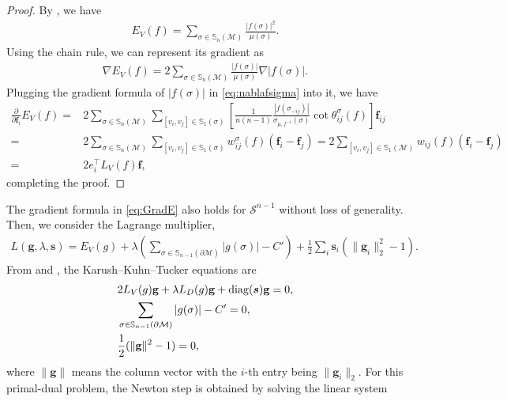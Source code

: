 \documentclass{article}
\begin{document}
\begin{proof}
By , we have
\begin{align}
    E_V(f) =  \sum_{\sigma\in\mathbb{S}_n(\mathcal{M})} \frac{|f(\sigma)|^2}{\mu(\sigma)}.
\end{align}
Using the chain rule, we can represent its gradient as
\begin{align}
    \nabla E_V(f) = 2 \sum_{\sigma\in\mathbb{S}_n(\mathcal{M})} \frac{|f(\sigma)|}{\mu(\sigma)} \nabla |f(\sigma)|.
\end{align}
Plugging the gradient formula of $|f(\sigma)|$ in \eqref{eq:nablafsigma} into it, we have
\begin{align}
    \frac{\partial}{\partial \mathbf{f}_i} E_V(f) = &2 \sum_{\sigma\in\mathbb{S}_n(\mathcal{M})}  \sum_{[v_i,v_j] \in \mathbb{S}_1(\sigma)} \left[\frac{1}{n(n-1)}\frac{|f(\sigma_{-ij})|}{\sigma_{\mu,f^{-1}}(\sigma)} \cot\theta_{ij}^{\sigma}(f) \right] \mathbf{f}_{ij}\\
     = & 2 \sum_{\sigma\in\mathbb{S}_n(\mathcal{M})} \sum_{[v_i,v_j] \in \mathbb{S}_1(\sigma)} w_{ij}^{\sigma}(f) (\mathbf{f}_i - \mathbf{f}_j)
     = 2 \sum_{[v_{i},v_j] \in \mathbb{S}_1(\mathcal{M})} w_{ij}(f) (\mathbf{f}_i - \mathbf{f}_j)\\
     =& 2 e_i^\top L_V(f) \mathbf{f},
\end{align}
completing the proof.
\end{proof}
The gradient formula in \eqref{eq:GradE} also holds for $\mathcal{S}^{n-1}$ without loss of generality. Then, we consider the Lagrange multiplier,
\begin{align} \label{eq:lagrange}
    L(\mathbf{g},\lambda,\boldsymbol{s}) = E_V(g) + \lambda (\sum_{\sigma\in \mathbb{S}_{n-1}(\partial \mathcal{M})} |g(\sigma)| - C') + \frac{1}{2}\sum_i \boldsymbol{s}_i (\|\mathbf{g}_i\|_2^2 - 1).
\end{align}
From  and , the Karush–Kuhn–Tucker equations are
\begin{align}
    &2L_V(g)\mathbf{g} + \lambda L_D(g) \mathbf{g} + \mathrm{diag}(\boldsymbol{s}) \mathbf{g} = 0,\\
    &\sum_{\sigma\in \mathbb{S}_{n-1}(\partial \mathcal{M})} |g(\sigma)| - C' = 0,\\
    & \frac{1}{2}(\|\mathbf{g}\|^2 - 1) = 0,
\end{align}
where $\|\mathbf{g}\|$ means the column vector with the $i$-th entry being $\|\mathbf{g}_i\|_2$. For this primal-dual problem, the Newton step is obtained by solving the linear system
\end{document}

